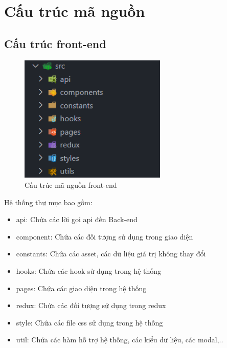 \section{Cấu trúc mã nguồn}
\subsection{Cấu trúc front-end}
\begin{figure}[!htp]
    \begin{center}
        \includegraphics[width=7cm]{img/file-structure/front-end.png}
    \end{center}
    \caption{Cấu trúc mã nguồn front-end}
\end{figure}

Hệ thống thư mục bao gồm:
\begin{itemize}
    \item api: Chứa các lời gọi api đến Back-end
    \item component: Chứa các đối tượng sử dụng trong giao diện
    \item constants: Chứa các asset, các dữ liệu giá trị không thay đổi
    \item hooks: Chứa các hook sử dụng trong hệ thống
    \item pages: Chứa các giao diện trong hệ thống
    \item redux: Chứa các đối tượng sử dụng trong redux
    \item style: Chứa các file css sử dụng trong hệ thống
    \item util: Chứa các hàm hỗ trợ hệ thống, các kiểu dữ liệu, các modal,..
\end{itemize}


